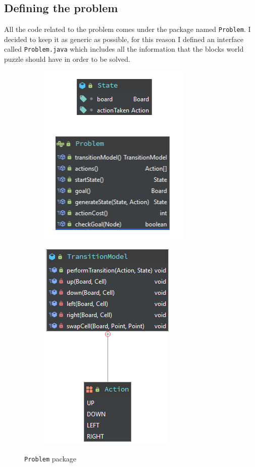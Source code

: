 \documentclass{article}
\def\code#1{\texttt{#1}}
\begin{document}
\subsection{Defining the problem}
All the code related to the problem comes under the package named \code{Problem}. I decided to keep it as generic as possible, for this reason I defined an interface called \code{Problem.java} which includes all the information that the blocks world puzzle should have in order to be solved.

\begin{figure}[H]
\centering
\begin{subfigure}{.5\textwidth}
  \centering
  \includegraphics[width=.5\linewidth]{stateAndProblem.png}
  \label{fig:sub1}
\end{subfigure}%
\begin{subfigure}{.5\textwidth}
  \centering
  \includegraphics[width=.5\linewidth]{transition.png}
  \label{fig:sub2}
\end{subfigure}
\caption{\code{Problem} package}
\label{fig:test}
\end{figure}
\end{document}
